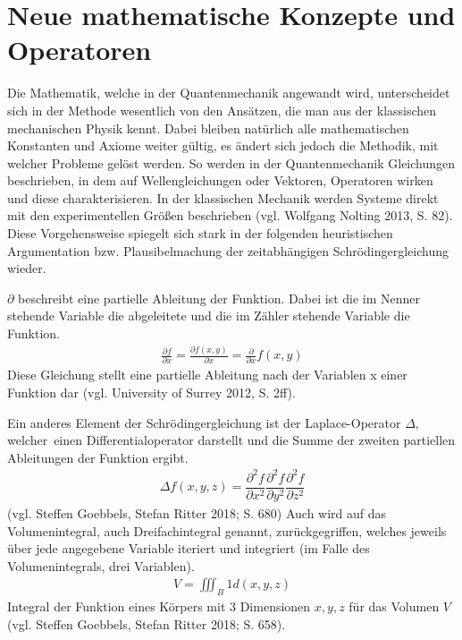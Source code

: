 \documentclass[12pt,oneside, a4paper]{scrbook}
\begin{document}
\section{Neue mathematische Konzepte und Operatoren}

Die Mathematik, welche in der Quantenmechanik angewandt wird, unterscheidet sich in der Methode wesentlich von den Ansätzen, die man aus der klassischen mechanischen Physik kennt. Dabei bleiben natürlich alle mathematischen Konstanten und Axiome weiter gültig, es ändert sich jedoch die Methodik, mit welcher Probleme gelöst werden. 
So werden in der Quantenmechanik Gleichungen beschrieben, in dem auf Wellengleichungen oder Vektoren, Operatoren wirken und diese charakterisieren. In der klassischen Mechanik werden Systeme direkt mit den experimentellen Größen beschrieben (vgl. Wolfgang Nolting 2013, S. 82).
Diese Vorgehensweise spiegelt sich stark in der folgenden heuristischen Argumentation bzw. Plausibelmachung der zeitabhängigen Schrödingergleichung wieder.

$\partial$ beschreibt eine partielle Ableitung der Funktion. Dabei ist die im Nenner stehende Variable die abgeleitete und die im Zähler stehende Variable die Funktion. 
\begin{align}
\frac{\partial f}{\partial x}= \frac{\partial f(x,y)}{\partial x} = \frac {\partial}{\partial x}f(x,y)
\end{align}
Diese Gleichung stellt eine partielle Ableitung nach der Variablen x einer Funktion dar (vgl. University of Surrey 2012, S. 2ff).

Ein anderes Element der Schrödingergleichung ist der Laplace-Operator $\Delta$, welcher einen Differentialoperator darstellt und die Summe der zweiten partiellen Ableitungen der Funktion ergibt.
\begin{align}
\Delta f(x,y,z) = \dfrac{\partial^2f}{\partial x^2} \dfrac{\partial^2f}{\partial y^2} \dfrac{\partial^2f}{\partial z^2}
\end{align}
(vgl. Steffen Goebbels, Stefan Ritter 2018; S. 680)\newline
Auch wird auf das Volumenintegral, auch Dreifachintegral genannt, zurückgegriffen, welches jeweils über jede angegebene Variable iteriert und integriert (im Falle des Volumenintegrals, drei Variablen).
\begin{align}
V = \iiint _{B} 1d(x,y,z)
\end{align}
Integral der Funktion eines Körpers mit 3 Dimensionen $x,y,z$ für das Volumen $V$ (vgl. Steffen Goebbels, Stefan Ritter 2018; S. 658).
\end{document}
